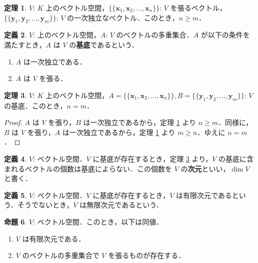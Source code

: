 \documentclass{jlreq}
\theoremstyle{definition}
\newtheorem{thm}{定理}[subsection]
\newtheorem{dfn}[thm]{定義}
\newtheorem{prop}[thm]{命題}
\begin{document}
      \begin{thm}\label{spanning-list-is-longer-than-independent-list}
        $V$: $K$ 上のベクトル空間，$\{\{\bm{x}_1, \bm{x}_2, \dots, \bm{x}_n\}\}$: $V$ を張るベクトル，$\{\{\bm{y}_1, \bm{y}_2, \dots, \bm{y}_m\}\}$: $V$ の一次独立なベクトル．このとき，$n \geq m$．
      \end{thm}
      \begin{dfn}
        $V$: 上のベクトル空間，$A$: $V$ のベクトルの多重集合．$A$ が以下の条件を満たすとき，$A$ は $V$ の\textbf{基底}であるという．
        \begin{enumerate}
          \item $A$ は一次独立である．
          \item $A$ は $V$ を張る．
        \end{enumerate}
      \end{dfn}
      \begin{thm}\label{well-definedness-of-dimension}
        $V$: $K$ 上のベクトル空間，$A=\{\{\bm{x}_1, \bm{x}_2, \dots, \bm{x}_n\}\}, B=\{\{\bm{y}_1, \bm{y}_2, \dots, \bm{y}_m\}\}$: $V$ の基底．このとき，$n = m$．  
      \end{thm}
      \begin{proof}
        $A$ は $V$ を張り，$B$ は一次独立であるから，定理 \ref{spanning-list-is-longer-than-independent-list} より $n \geq m$．同様に，$B$ は $V$ を張り，$A$ は一次独立であるから，定理 \ref{spanning-list-is-longer-than-independent-list} より $m \geq n$．ゆえに $n = m$．
      \end{proof}
      \begin{dfn}
        $V$: ベクトル空間．$V$ に基底が存在するとき，定理 \ref{well-definedness-of-dimension} より，$V$ の基底に含まれるベクトルの個数は基底によらない．この個数を $V$ の\textbf{次元}といい，$\dim V$ と書く．
      \end{dfn}
      \begin{dfn}
        $V$: ベクトル空間．$V$ に基底が存在するとき，$V$ は有限次元であるという．そうでないとき，$V$ は無限次元であるという．
      \end{dfn}
      \begin{prop}
        $V$: ベクトル空間．このとき，以下は同値．
        \begin{enumerate}
          \item $V$ は有限次元である．
          \item $V$ のベクトルの多重集合で $V$ を張るものが存在する．
        \end{enumerate}
      \end{prop}
\end{document}

